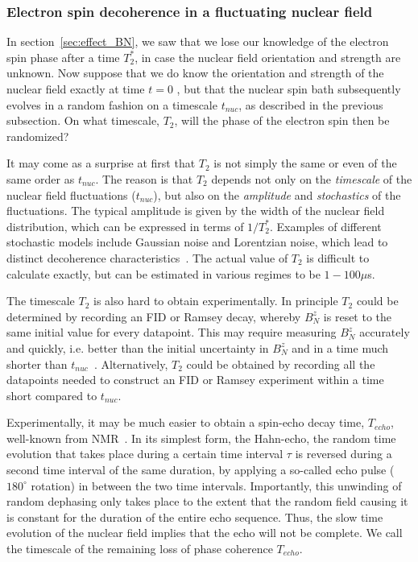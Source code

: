 \documentclass[12pt,aps,nofootinbib]{revtex4-1}
\begin{document}

\subsubsection{Electron spin decoherence in a fluctuating nuclear field}
\label{sec:T2_BN}

In section~\ref{sec:effect_BN}, we saw that we lose our knowledge of the electron spin phase after a time $T_2^*$, in case the nuclear field orientation and strength are unknown. Now suppose that we do know the orientation and strength of the nuclear field exactly at time $t=0$ , but that the nuclear spin bath subsequently evolves in a random fashion on a timescale $t_{nuc}$, as described in the previous subsection. On what timescale, $T_2$, will the phase of the electron spin then be randomized?

It may come as a surprise at first that $T_2$ is not simply the same or even of the same order as $t_{nuc}$. The reason is that $T_2$ depends not only on the \emph{timescale} of the nuclear field fluctuations ($t_{nuc}$), but also on the \emph{amplitude} and \emph{stochastics} of the fluctuations. The typical amplitude is given by the width of the nuclear field distribution, which can be expressed in terms of $1/T_2^*$. Examples of different stochastic models include Gaussian noise and Lorentzian noise, which lead to distinct decoherence characteristics~\cite{klauder62,sousa06}.  The actual value of $T_2$ is difficult to calculate exactly, but can be estimated in various regimes to be $1 - 100 \mu$s. 

The timescale $T_2$ is also hard to obtain experimentally. In principle $T_2$ could be determined by recording an FID or Ramsey decay, whereby $B_N^z$ is reset to the same initial value for every datapoint. This may require measuring $B_N^z$ accurately and quickly, i.e. better than the initial uncertainty in $B_N^z$ and in a time much shorter than $t_{nuc}$~\cite{klauser06,stepanenko06,giedke06}. Alternatively, $T_2$ could be obtained by recording all the datapoints needed to construct an FID or Ramsey experiment within a time short compared to $t_{nuc}$.

Experimentally, it may be much easier to obtain a spin-echo decay time, $T_{echo}$, well-known from NMR~\cite{vandersypen04c,freeman97}. In its simplest form, the Hahn-echo, the random time evolution that takes place during a certain time interval $\tau$ is reversed during a second time interval of the same duration, by applying a so-called echo pulse ($180^\circ$ rotation) in between the two time intervals. Importantly, this unwinding of random dephasing only takes place to the extent that the random field causing it is constant for the duration of the entire echo sequence. Thus, the slow time evolution of the nuclear field implies that the echo will not be complete. We call the timescale of the remaining loss of phase coherence $T_{echo}$.
\end{document}
